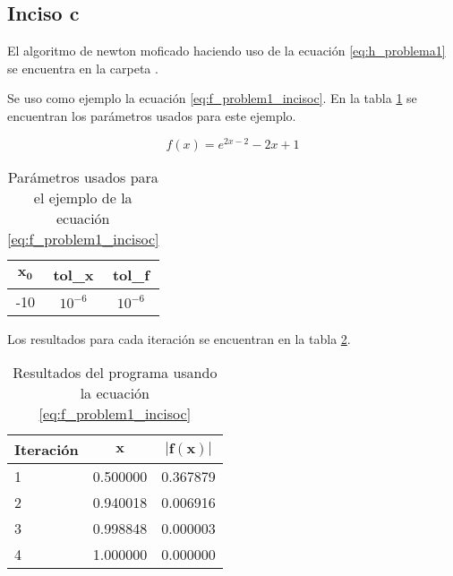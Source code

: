 \subsection*{Inciso c}

El algoritmo de newton moficado haciendo uso de la ecuación \ref{eq:h_problema1} se encuentra en la carpeta .

Se uso como ejemplo la ecuación \ref{eq:f_problem1_incisoc}. En la tabla  \ref{table:problem1_parameters} se encuentran los parámetros usados para este ejemplo.


\begin{equation}
    f(x) = e^{2x-2}-2x+1 \label{eq:f_problem1_incisoc}
\end{equation}

\begin{table}[H]
    \centering
    \begin{tabular}{ccc} \hline
        $\mathbf{x_0}$ & \textbf{tol\_x} & \textbf{tol\_f} \\   \hline
        -10            & $10^{-6}$       & $10^{-6}$       \\  \hline
    \end{tabular}
    \caption{Parámetros usados para el ejemplo de la ecuación \ref{eq:f_problem1_incisoc}}
    \label{table:problem1_parameters}
\end{table}

Los resultados para cada iteración se encuentran en la tabla \ref{table:problema1_results}.
\begin{table}[H]
    \centering
    \begin{tabular}{lcc} \hline
        \textbf{Iteración} & $\mathbf{x}$ & $\mathbf{|f(x)|}$ \\ \hline
        1                  & 0.500000     & 0.367879          \\
        2                  & 0.940018     & 0.006916          \\
        3                  & 0.998848     & 0.000003          \\
        4                  & 1.000000     & 0.000000          \\ \hline
    \end{tabular}
    \caption{Resultados del programa usando la ecuación \ref{eq:f_problem1_incisoc}}
    \label{table:problema1_results}
\end{table}
